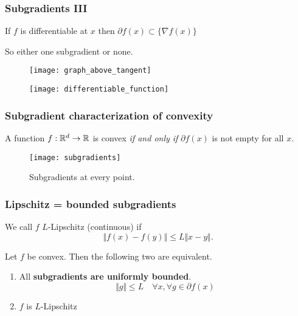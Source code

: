 \documentclass{beamer}
\begin{document}
\begin{frame}
  \frametitle{Subgradients III}
  \begin{lemma}%
    If $f$ is differentiable at $x$ then $\partial f(x) \subset \{\nabla f(x)\}$
  \end{lemma}
  So either one subgradient or none.\\
  \begin{minipage}{0.48\textwidth}
    \begin{figure}[ht]
      \centering
      \texttt{[image: graph\_above\_tangent]}
    \end{figure}
  \end{minipage}
  \hfill
  \begin{minipage}{0.48\textwidth}
    \begin{figure}[ht]
      \centering
      \texttt{[image: differentiable\_function]}
    \end{figure}
  \end{minipage}
\end{frame}

\begin{frame}
  \frametitle{Subgradient characterization of convexity}
  \begin{lemma}%
    A function $f: \mathbb{R}^d \to \mathbb{R}$ is convex \textit{if and only if} $\partial f(x)$ is not empty for all $x$.
  \end{lemma}
  \begin{figure}[ht]
    \centering
    \texttt{[image: subgradients]}
    \caption{Subgradients at every point.}
  \end{figure}
\end{frame}

\begin{frame}
  \frametitle{Lipschitz = bounded subgradients}
  \begin{definition}
    We call $f$ $L$-Lipschitz (continuous) if
    \begin{equation}
      \Vert f(x)-f(y) \Vert \le L \Vert x-y \Vert.
    \end{equation}
  \end{definition}
  \begin{lemma}%
    Let $f$ be convex. Then the following two are equivalent.
    \begin{enumerate}
      \item All \textbf{subgradients are uniformly bounded}.
            \begin{equation}
              \Vert g \Vert \le L \quad \forall x, \forall g \in \partial f(x)
            \end{equation}
      \item $f$ is $L$-Lipschitz
    \end{enumerate}
  \end{lemma}
\end{frame}
\end{document}
